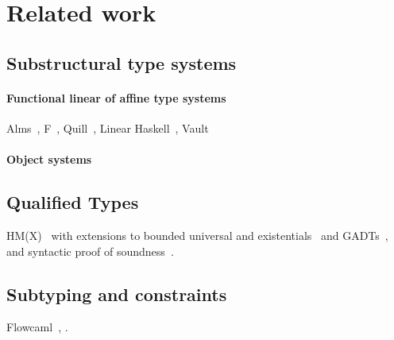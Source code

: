 \section{Related work}

\subsection{Substructural type systems}

\paragraph{Functional linear of affine type systems}

Alms~\citep{DBLP:conf/popl/TovP11},
F\degree~\citep{DBLP:conf/tldi/MazurakZZ10},
Quill~\citep{DBLP:conf/icfp/Morris16},
Linear Haskell~\citep{DBLP:journals/pacmpl/BernardyBNJS18},
Vault\citep{DBLP:conf/pldi/DeLineF01,DBLP:conf/pldi/FahndrichD02}

\paragraph{Object systems}
\TODO{}

\subsection{Qualified Types}

HM(X)~\citep{DBLP:journals/tapos/OderskySW99} with extensions to
bounded universal and existentials~\citep{DBLP:conf/icfp/Simonet03}
and GADTs~\citep{DBLP:journals/toplas/SimonetP07},
and syntactic proof of soundness~\citep{DBLP:journals/entcs/SkalkaP02}.

\subsection{Subtyping and constraints}

Flowcaml~\citep{DBLP:conf/popl/PottierS02},
\citet{DBLP:conf/sas/TrifonovS96}.


